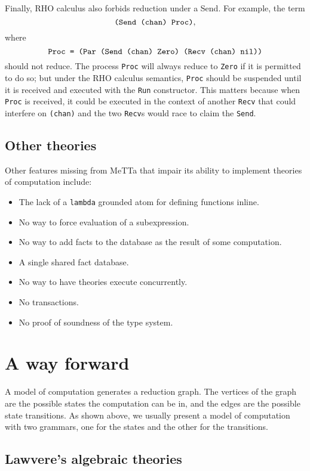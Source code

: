 \documentclass{article}
\begin{document}
Finally, RHO calculus also forbids reduction under a Send.  For example, the term 
\[\mbox{\tt(Send (chan) Proc)},\]
where
\[\mbox{\tt Proc = (Par (Send (chan) Zero) (Recv (chan) nil))}\]
should not reduce.  The process \verb+Proc+ will always reduce to \verb+Zero+ if it is permitted to do so; but under the RHO calculus semantics, \verb+Proc+ should be suspended until it is received and executed with the \verb+Run+ constructor.  This matters because when \verb+Proc+ is received, it could be executed in the context of another \verb+Recv+ that could interfere on \verb+(chan)+ and the two \verb+Recv+s would race to claim the \verb+Send+.

\subsection{Other theories}

Other features missing from MeTTa that impair its ability to implement theories of computation include:
\begin{itemize}
    \item The lack of a \verb+lambda+ grounded atom for defining functions inline.
    \item No way to force evaluation of a subexpression.
    \item No way to add facts to the database as the result of some computation.
    \item A single shared fact database.
    \item No way to have theories execute concurrently.
    \item No transactions.
    \item No proof of soundness of the type system.
\end{itemize}

\section{A way forward}

A model of computation generates a reduction graph.  The vertices of the graph are the possible states the computation can be in, and the edges are the possible state transitions.  As shown above, we usually present a model of computation with two grammars, one for the states and the other for the transitions.

\subsection{Lawvere's algebraic theories}
\end{document}
